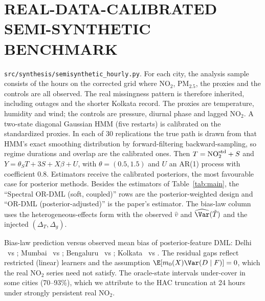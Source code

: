 \section{REAL-DATA-CALIBRATED SEMI-SYNTHETIC BENCHMARK}
\label{app:semisyn}
\texttt{src/synthesis/semisynthetic\_hourly.py}. For each city, the analysis sample consists of the hours on the corrected grid where NO$_2$, PM$_{2.5}$, the proxies and the controls are all observed. The real missingness pattern is therefore inherited, including outages and the shorter Kolkata record. The proxies are temperature, humidity and wind; the controls are pressure, diurnal phase and lagged NO$_2$. A two-state diagonal Gaussian HMM (five restarts) is calibrated on the standardized proxies. In each of 30 replications the true path is drawn from that HMM's exact smoothing distribution by forward-filtering backward-sampling, so regime durations and overlap are the calibrated ones. Then $T=\mathrm{NO}_2^{\rm std}+S$ and $Y=\theta_ST+3S+X\beta+U$, with $\theta=(0.5,1.5)$ and $U$ an AR(1) process with coefficient 0.8. Estimators receive the calibrated posteriors, the most favourable case for posterior methods. Besides the estimators of Table~\ref{tab:main}, the ``Spectral OR-DML (soft, coupled)'' rows are the posterior-weighted design and ``OR-DML (posterior-adjusted)'' is the paper's estimator. The bias-law column uses the heterogeneous-effects form with the observed $\hat v$ and $\widehat{\Var}(\tilde T)$ and the injected $(\Delta_T,\Delta_g)$.
\begin{table}[h]\centering\scriptsize
\caption{Semi-synthetic benchmark, all estimators (\texttt{reports/synthesis/semisynthetic\_hourly\_summary.csv}). Coverage: nominal 95\% intervals for the sample ATE.}\label{tab:ss_full}

\end{table}
Bias-law prediction versus observed mean bias of posterior-feature DML: Delhi \SSDelhiLaw\ vs \SSDelhiObs; Mumbai \SSMumbaiLaw\ vs \SSMumbaiObs; Bengaluru \SSBengaluruLaw\ vs \SSBengaluruObs; Kolkata \SSKolkataLaw\ vs \SSKolkataObs. The residual gaps reflect restricted (linear) learners and the assumption $\E[m_0(X)\Var(D\mid F)]=0$, which the real NO$_2$ series need not satisfy. The oracle-state intervals under-cover in some cities (70--93\%), which we attribute to the HAC truncation at 24 hours under strongly persistent real NO$_2$.

